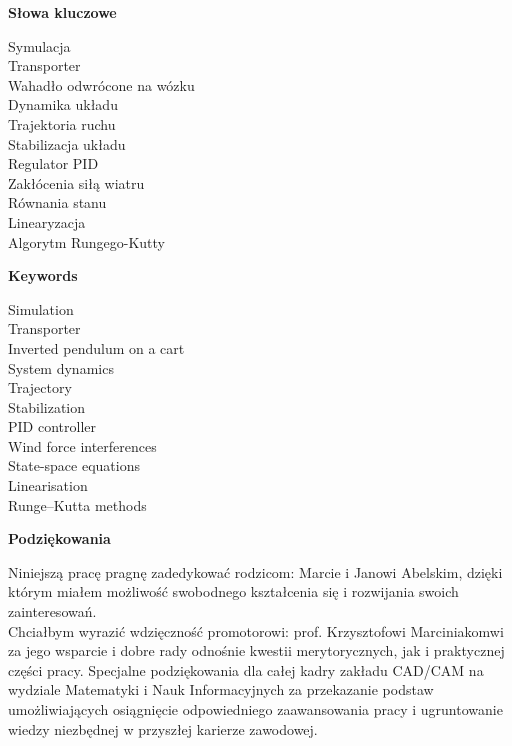 \documentclass[12pt, oneside]{report}
\theoremstyle{definition}
\begin{document}

\newpage
\pagestyle{empty}
\vspace*{\fill}
\begin{center}
\LARGE\textbf{Słowa kluczowe}\\
\end{center}
\begin{center}
Symulacja\\
Transporter\\
Wahadło odwrócone na wózku\\
Dynamika układu\\
Trajektoria ruchu\\
Stabilizacja układu\\
Regulator PID\\
Zakłócenia siłą wiatru \\
Równania stanu\\
Linearyzacja\\
Algorytm Rungego-Kutty
\end{center}
\vspace{\fill}

\newpage
\pagestyle{empty}
\vspace*{\fill}
\begin{center}
\LARGE\textbf{Keywords}\\
\end{center}
\begin{center}
Simulation\\
Transporter\\
Inverted pendulum on a cart\\
System dynamics\\
Trajectory\\
Stabilization\\
PID controller\\
Wind force interferences\\
State-space equations\\
Linearisation\\
Runge–Kutta methods
\end{center}
\vspace{\fill}

\newpage
\pagestyle{empty}
\vspace*{\fill}
\begin{center}
\LARGE\textbf{Podziękowania}\\
\end{center}
Niniejszą pracę pragnę zadedykować rodzicom: Marcie i Janowi Abelskim, dzięki którym miałem możliwość swobodnego kształcenia się i rozwijania swoich zainteresowań.
\vspace{10px}
\\
Chciałbym wyrazić wdzięczność promotorowi: prof. Krzysztofowi Marciniakomwi za jego wsparcie i dobre rady odnośnie kwestii merytorycznych, jak i praktycznej części pracy. Specjalne podziękowania dla całej kadry zakładu CAD/CAM na wydziale Matematyki i Nauk Informacyjnych za przekazanie podstaw umożliwiających osiągnięcie odpowiedniego zaawansowania pracy i ugruntowanie wiedzy niezbędnej w przyszłej karierze zawodowej.
\end{document}
